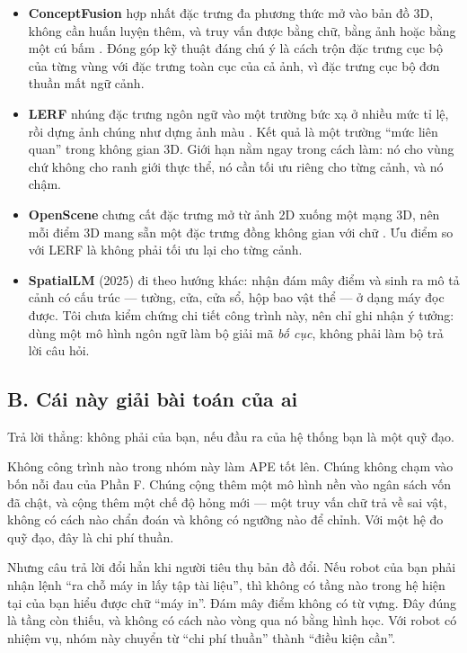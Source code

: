 \documentclass[../../deep_learning.tex]{subfiles}
\begin{document}
\begin{itemize}
\item \textbf{ConceptFusion} hợp nhất đặc trưng đa phương thức mở vào bản đồ 3D, không cần huấn luyện thêm, và truy vấn được bằng chữ, bằng ảnh hoặc bằng một cú bấm \cite{jatavallabhula2023conceptfusion}. Đóng góp kỹ thuật đáng chú ý là cách trộn đặc trưng cục bộ của từng vùng với đặc trưng toàn cục của cả ảnh, vì đặc trưng cục bộ đơn thuần mất ngữ cảnh.
\item \textbf{LERF} nhúng đặc trưng ngôn ngữ vào một trường bức xạ ở nhiều mức tỉ lệ, rồi dựng ảnh chúng như dựng ảnh màu \cite{kerr2023lerf}. Kết quả là một trường ``mức liên quan'' trong không gian 3D. Giới hạn nằm ngay trong cách làm: nó cho vùng chứ không cho ranh giới thực thể, nó cần tối ưu riêng cho từng cảnh, và nó chậm.
\item \textbf{OpenScene} chưng cất đặc trưng mở từ ảnh 2D xuống một mạng 3D, nên mỗi điểm 3D mang sẵn một đặc trưng đồng không gian với chữ \cite{peng2023openscene}. Ưu điểm so với LERF là không phải tối ưu lại cho từng cảnh.
\item \textbf{SpatialLM} (2025) đi theo hướng khác: nhận đám mây điểm và sinh ra mô tả cảnh có cấu trúc --- tường, cửa, cửa sổ, hộp bao vật thể --- ở dạng máy đọc được. Tôi chưa kiểm chứng chi tiết công trình này, nên chỉ ghi nhận ý tưởng: dùng một mô hình ngôn ngữ làm bộ giải mã \emph{bố cục}, không phải làm bộ trả lời câu hỏi.
\end{itemize}

\subsection{B. Cái này giải bài toán của ai}
Trả lời thẳng: không phải của bạn, nếu đầu ra của hệ thống bạn là một quỹ đạo.

Không công trình nào trong nhóm này làm APE tốt lên. Chúng không chạm vào bốn nỗi đau của Phần F. Chúng cộng thêm một mô hình nền vào ngân sách vốn đã chật, và cộng thêm một chế độ hỏng mới --- một truy vấn chữ trả về sai vật, không có cách nào chẩn đoán và không có ngưỡng nào để chỉnh. Với một hệ đo quỹ đạo, đây là chi phí thuần.

Nhưng câu trả lời đổi hẳn khi người tiêu thụ bản đồ đổi. Nếu robot của bạn phải nhận lệnh ``ra chỗ máy in lấy tập tài liệu'', thì không có tầng nào trong hệ hiện tại của bạn hiểu được chữ ``máy in''. Đám mây điểm không có từ vựng. Đây đúng là tầng còn thiếu, và không có cách nào vòng qua nó bằng hình học. Với robot có nhiệm vụ, nhóm này chuyển từ ``chi phí thuần'' thành ``điều kiện cần''.
\end{document}
